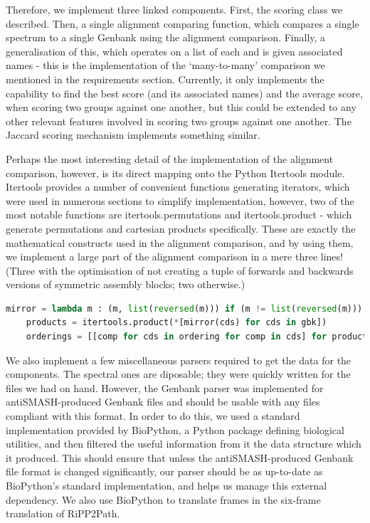\documentclass{l4proj}
\begin{document}
Therefore, we implement three linked components. First, the scoring class we described. Then, a single alignment comparing function, which compares a single spectrum to a single Genbank using the alignment comparison. Finally, a generalisation of this, which operates on a list of each and is given associated names - this is the implementation of the `many-to-many' comparison we mentioned in the requirements section. Currently, it only implements the capability to find the best score (and its associated names) and the average score, when scoring two groups against one another, but this could be extended to any other relevant features involved in scoring two groups against one another. The Jaccard scoring mechanism implements something similar.

Perhaps the most interesting detail of the implementation of the alignment comparison, however, is its direct mapping onto the Python Itertools module. Itertools provides a number of convenient functions generating iterators, which were used in numerous sections to simplify implementation, however, two of the most notable functions are itertools.permutations and itertools.product - which generate permutations and cartesian products specifically. These are exactly the mathematical constructs used in the alignment comparison, and by using them, we implement a large part of the alignment comparison in a mere three lines! (Three with the optimisation of not creating a tuple of forwards and backwards versions of symmetric assembly blocks; two otherwise.)

\begin{lstlisting}[language=python, float, caption={The three lines of code used to generate all possible assembly-orderings for the alignment comparison.}, label=lst:svmclasses]
	mirror = lambda m : (m, list(reversed(m))) if (m != list(reversed(m))) else (m,)
	products = itertools.product(*[mirror(cds) for cds in gbk])
	orderings = [[comp for cds in ordering for comp in cds] for product in products for ordering in itertools.permutations(product, len(product))]
\end{lstlisting}

We also implement a few miscellaneous parsers required to get the data for the components. The spectral ones are diposable; they were quickly written for the files we had on hand. However, the Genbank parser was implemented for antiSMASH-produced Genbank files and should be usable with any files compliant with this format. In order to do this, we used a standard implementation provided by BioPython, a Python package defining biological utilities, and then filtered the useful information from it the data structure which it produced. This should ensure that unless the antiSMASH-produced Genbank file format is changed significantly, our parser should be as up-to-date as BioPython's standard implementation, and helps us manage this external dependency. We also use BioPython to translate frames in the six-frame translation of RiPP2Path.
\end{document}
